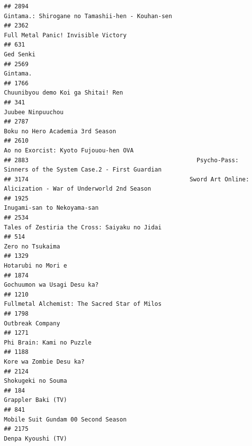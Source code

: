 \documentclass[
]{article}
\begin{document}
\begin{verbatim}
## 2894                                                          Gintama.: Shirogane no Tamashii-hen - Kouhan-sen
## 2362                                                                       Full Metal Panic! Invisible Victory
## 631                                                                                                  Ged Senki
## 2569                                                                                                  Gintama.
## 1766                                                                        Chuunibyou demo Koi ga Shitai! Ren
## 341                                                                                          Juubee Ninpuuchou
## 2787                                                                          Boku no Hero Academia 3rd Season
## 2610                                                                     Ao no Exorcist: Kyoto Fujouou-hen OVA
## 2883                                                Psycho-Pass: Sinners of the System Case.2 - First Guardian
## 3174                                              Sword Art Online: Alicization - War of Underworld 2nd Season
## 1925                                                                               Inugami-san to Nekoyama-san
## 2534                                                             Tales of Zestiria the Cross: Saiyaku no Jidai
## 514                                                                                           Zero no Tsukaima
## 1329                                                                                        Hotarubi no Mori e
## 1874                                                                               Gochuumon wa Usagi Desu ka?
## 1210                                                             Fullmetal Alchemist: The Sacred Star of Milos
## 1798                                                                                          Outbreak Company
## 1271                                                                                 Phi Brain: Kami no Puzzle
## 1188                                                                                   Kore wa Zombie Desu ka?
## 2124                                                                                        Shokugeki no Souma
## 184                                                                                         Grappler Baki (TV)
## 841                                                                        Mobile Suit Gundam 00 Second Season
## 2175                                                                                        Denpa Kyoushi (TV)

\end{verbatim}
\end{document}
